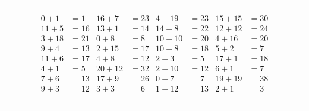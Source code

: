 \documentclass{article}
\begin{document}
\begin{sloppy}
\hrule
\begin{align*}
    {0} + {1} &= {1} & {16} + {7} &= {23} & {4} + {19} &= {23} & {15} + {15} &= {30} \\
    {11} + {5} &= {16} & {13} + {1} &= {14} & {14} + {8} &= {22} & {12} + {12} &= {24} \\
    {3} + {18} &= {21} & {0} + {8} &= {8} & {10} + {10} &= {20} & {4} + {16} &= {20} \\
    {9} + {4} &= {13} & {2} + {15} &= {17} & {10} + {8} &= {18} & {5} + {2} &= {7} \\
    {11} + {6} &= {17} & {4} + {8} &= {12} & {2} + {3} &= {5} & {17} + {1} &= {18} \\
    {4} + {1} &= {5} & {20} + {12} &= {32} & {2} + {10} &= {12} & {6} + {1} &= {7} \\
    {7} + {6} &= {13} & {17} + {9} &= {26} & {0} + {7} &= {7} & {19} + {19} &= {38} \\
    {9} + {3} &= {12} & {3} + {3} &= {6} & {1} + {12} &= {13} & {2} + {1} &= {3} \\
\end{align*}
\hrule
\end{sloppy}
\end{document}
